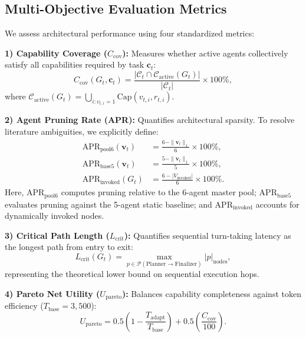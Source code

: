 \documentclass[conference]{IEEEtran}
\begin{document}
\subsection{Multi-Objective Evaluation Metrics}
We assess architectural performance using four standardized metrics:

\textbf{1) Capability Coverage ($C_{\mathrm{cov}}$):} Measures whether active agents collectively satisfy all capabilities required by task $\mathbf{c}_t$:
\begin{equation}
C_{\mathrm{cov}}(G_t, \mathbf{c}_t) = \frac{|\mathcal{C}_t \cap \mathcal{C}_{\mathrm{active}}(G_t)|}{|\mathcal{C}_t|} \times 100\%,
\end{equation}
where $\mathcal{C}_{\mathrm{active}}(G_t) = \bigcup_{i: v_{t,i}=1} \mathrm{Cap}(v_{t,i}, r_{t,i})$.

\textbf{2) Agent Pruning Rate (APR):} Quantifies architectural sparsity. To resolve literature ambiguities, we explicitly define:
\begin{align}
\mathrm{APR}_{\mathrm{pool6}}(\mathbf{v}_t) &= \frac{6 - \|\mathbf{v}_t\|_1}{6} \times 100\%, \label{eq:apr_pool6} \\
\mathrm{APR}_{\mathrm{base5}}(\mathbf{v}_t) &= \frac{5 - \|\mathbf{v}_t\|_1}{5} \times 100\%, \label{eq:apr_base5} \\
\mathrm{APR}_{\mathrm{invoked}}(G_t) &= \frac{6 - |V_{\mathrm{invoked}}|}{6} \times 100\%. \label{eq:apr_invoked}
\end{align}
Here, $\mathrm{APR}_{\mathrm{pool6}}$ computes pruning relative to the 6-agent master pool; $\mathrm{APR}_{\mathrm{base5}}$ evaluates pruning against the 5-agent static baseline; and $\mathrm{APR}_{\mathrm{invoked}}$ accounts for dynamically invoked nodes.

\textbf{3) Critical Path Length ($L_{\mathrm{crit}}$):} Quantifies sequential turn-taking latency as the longest path from entry to exit:
\begin{equation}
L_{\mathrm{crit}}(G_t) = \max_{p \in \mathcal{P}(\mathrm{Planner} \to \mathrm{Finalizer})} |p|_{\mathrm{nodes}},
\label{eq:critical_path}
\end{equation}
representing the theoretical lower bound on sequential execution hops.

\textbf{4) Pareto Net Utility ($U_{\mathrm{pareto}}$):} Balances capability completeness against token efficiency ($T_{\mathrm{base}} = 3,500$):
\begin{equation}
U_{\mathrm{pareto}} = 0.5 \left(1 - \frac{T_{\mathrm{adapt}}}{T_{\mathrm{base}}}\right) + 0.5 \left(\frac{C_{\mathrm{cov}}}{100}\right).
\label{eq:pareto_utility}
\end{equation}
\end{document}
